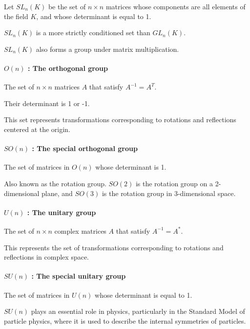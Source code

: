 \documentclass[uplatex,a4j,12pt,dvipdfmx]{jsarticle}
\begin{document}
Let $SL_{n}(K)$ be the set of $n \times n$ matrices whose components are all elements of the field $K$, and whose determinant is equal to 1.

$SL_{n}(K)$ is a more strictly conditioned set than $GL_{n}(K)$.

$SL_{n}(K)$ also forms a group under matrix multiplication.

\paragraph{$O(n)$ : The orthogonal group}

{}

The set of $n \times n$ matrices $A$ that satisfy $A^{-1} = A^{T}$.

Their determinant is 1 or -1.

This set represents transformations corresponding to rotations and reflections centered at the origin.

\paragraph{$SO(n)$ : The special orthogonal group}

{}

The set of matrices in $O(n)$ whose determinant is 1.

Also known as the rotation group.
$SO(2)$ is the rotation group on a 2-dimensional plane, and
$SO(3)$ is the rotation group in 3-dimensional space.

\paragraph{$U(n)$ : The unitary group}

{}

The set of $n \times n$ complex matrices $A$ that satisfy $A^{-1} = A^{*}$.

This represents the set of transformations corresponding to rotations and reflections in complex space.

\paragraph{$SU(n)$ : The special unitary group}

{}

The set of matrices in $U(n)$ whose determinant is equal to 1.

$SU(n)$ plays an essential role in physics, particularly in the Standard Model of particle physics, where it is used to describe the internal symmetries of particles.
\end{document}
